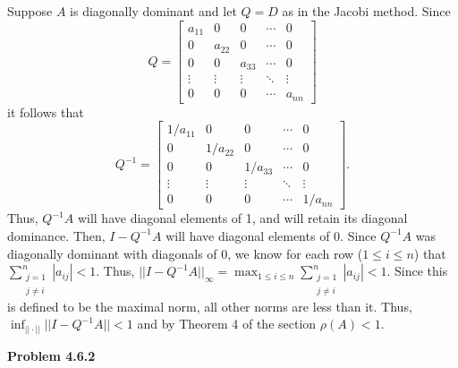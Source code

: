 \documentclass{article}
\newcommand{\Problem}[1]{\textbf{Problem #1}}
\begin{document}
Suppose $A$ is diagonally dominant and let $Q = D$ as in the Jacobi method. Since 
\begin{equation*}
Q = 
\begin{bmatrix}
a_{11} & 0 & 0 &\cdots & 0\\
0 & a_{22} & 0 &\cdots & 0\\
0 & 0 & a_{33} & \cdots & 0 \\
\vdots & \vdots & \vdots & \ddots & \vdots\\
0 & 0 & 0 & \cdots & a_{nn}
\end{bmatrix}
\end{equation*}
it follows that 
\begin{equation*}
Q^{-1} = 
\begin{bmatrix}
1/a_{11} & 0 & 0 &\cdots & 0\\
0 & 1/a_{22} & 0 &\cdots & 0\\
0 & 0 & 1/a_{33} & \cdots & 0 \\
\vdots & \vdots & \vdots & \ddots & \vdots\\
0 & 0 & 0 & \cdots & 1/a_{nn}
\end{bmatrix}.
\end{equation*}
Thus, $Q^{-1}A$ will have diagonal elements of 1, and will retain its diagonal dominance. Then, $I - Q^{-1}A$ will have diagonal elements of 0. Since $Q^{-1}A$ was diagonally dominant with diagonals of 0, we know for each row ($1 \leq i \leq n$) that $\displaystyle\sum_{\substack{j = 1\\j\neq i}}^n|a_{ij}| < 1$. Thus, $||I - Q^{-1}A||_{\infty} = \displaystyle\max_{1 \leq i \leq n} \displaystyle\sum_{\substack{j = 1\\j\neq i}}^n|a_{ij}| < 1$. Since this is defined to be the maximal norm, all other norms are less than it. Thus, $\displaystyle\inf_{|| \cdot||} ||I - Q^{-1}A|| < 1$ and by Theorem 4 of the section $\rho(A) < 1$. 

\Problem{4.6.2}
\end{document}
